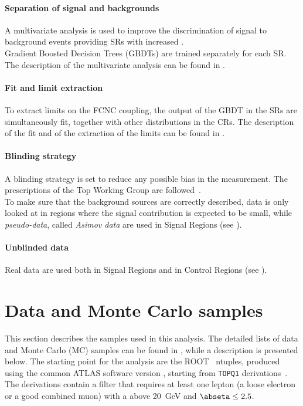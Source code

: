 \paragraph{Separation of signal and backgrounds}
A multivariate analysis is used to improve the discrimination of
signal to background events providing SRs with increased \ssb. \\
Gradient Boosted Decision Trees (GBDTs) are trained separately for each SR. 
The description of the multivariate analysis can be found in
. 

\paragraph{Fit and limit extraction}
To extract limits on the FCNC \tZc coupling, the output of the
GBDT in the SRs are simultaneously fit, together with other 
distributions in the CRs.
The description of the fit and of the extraction of the limits can be
found in .

\paragraph{Blinding strategy}
A blinding strategy is set to reduce any possible bias in the measurement. 
The prescriptions of the Top Working Group are followed~\cite{top:blind}.\\
To make sure that the background sources are correctly described,
data is only looked at in regions where the signal contribution is expected to be small, while 
\textit{pseudo-data}, called \textit{Asimov data} are used in Signal Regions (see ). 

\paragraph{Unblinded data }
Real data are used both in Signal Regions and in Control Regions (see ). 

\section{Data and Monte Carlo samples}
\label{sec:samples}
This section describes the samples used in this analysis.
The detailed lists of data and Monte Carlo (MC) samples can be found
in \App{\ref{appendix:app_mc}}, 
while a description is presented below.
The starting point for the analysis are the ROOT~\cite{Antcheva:2009zz} ntuples, produced using the common ATLAS software version
\anabasevers, starting from \texttt{TOPQ1} derivations~\cite{top:deriv}.\\
The derivations contain a filter that requires at least one lepton
(a loose electron or a good combined muon) with a \pT above \SI{20}{\GeV} and $\abseta \leq 2.5$. 

